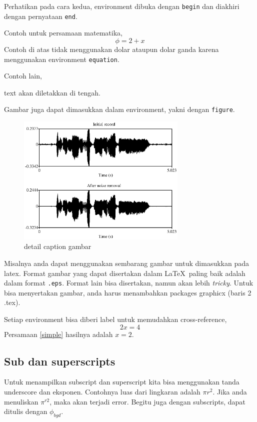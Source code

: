 \documentclass[12pt]{article}
\begin{document}
Perhatikan pada cara kedua, environment dibuka dengan \texttt{begin} dan diakhiri dengan pernyataan \texttt{end}.

Contoh untuk persamaan matematika,
\begin{equation}
\phi=2+x
\end{equation}
Contoh di atas tidak menggunakan dolar ataupun dolar ganda karena menggunakan environment \texttt{equation}.

Contoh lain,
\begin{center}
text akan diletakkan di tengah.
\end{center}



Gambar juga dapat dimasukkan dalam environment, yakni dengan \texttt{figure}.
\begin{figure}
\begin{center}
\includegraphics[width=3.2in]{pict/praat.eps}
\end{center}
\caption{detail caption gambar}
\end{figure}

Misalnya anda dapat menggunakan sembarang gambar untuk dimasukkan pada latex. Format gambar yang dapat disertakan dalam \LaTeX\ paling baik adalah dalam format \texttt{.eps}. Format lain bisa disertakan, namun akan lebih \textit{tricky}. Untuk bisa menyertakan gambar, anda harus menambahkan packages graphicx (baris 2 .tex).


Setiap environment bisa diberi label untuk memudahkan cross-reference,
\begin{equation}
\label{simple}
2x=4
\end{equation}
Persamaan \ref{simple} hasilnya adalah $x=2$.


\subsection{Sub dan superscripts}
Untuk menampilkan subscript dan superscript kita bisa menggunakan tanda underscore dan eksponen. Contohnya luas dari lingkaran adalah $\pi r^2$.  Jika anda menuliskan $\pi ^{r2}$, maka akan terjadi error. Begitu juga dengan subscripts, dapat ditulis dengan $\phi_{bgd}$. 
\end{document}
